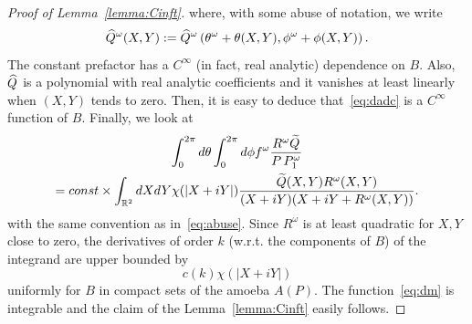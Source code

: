 \documentclass[10pt]{amsart}
\theoremstyle{definition}\newtheorem{defi}[theo]{Definition}\newtheorem{rema}[theo]{Remark}\newtheorem{exam}[theo]{Example}\newtheorem{exem}[theo]{Example}\newtheorem{nota}[theo]{Notation}
\newcommand{\bbR}{\mathbb{R}}
\let\oldtilde\tilde
\renewcommand*{\tilde}[1]{\mathchoice{\widetilde{#1}}{\widetilde{#1}}{\oldtilde{#1}}{\oldtilde{#1}}}
\let\oldhat\hat
\renewcommand*{\hat}[1]{\mathchoice{\widehat{#1}}{\widehat{#1}}{\oldhat{#1}}{\oldhat{#1}}}
\begin{document}
\begin{proof}[{Proof of Lemma~\ref{lemma:Cinft}}]
where, with some abuse of notation, we write
\begin{equation}\label{eq:abuse}
\hat Q^\omega(X,Y):=
\hat Q^\omega\left(\theta^\omega+\theta(X,Y),\phi^\omega+\phi(X,Y)\right).
\end{equation}
The constant prefactor has a $C^\infty$ (in fact, real analytic) dependence on $B$. Also, $\hat Q$ is a polynomial with real analytic coefficients and it vanishes at least linearly when $(X,Y)$ tends to zero. Then, it is easy to deduce that~\eqref{eq:dadc} is a $C^\infty$ function of $B$. Finally, we look at
\begin{multline}\label{eq:finally}
\int_0^{2\pi} d\theta \int_0^{2\pi}d\phi f^\omega \frac{R^\omega\tilde Q}{P\,P^\omega_1}\\
= const\times \int_{\bbR^2}dX dY \chi(|X+iY|)\frac{ \tilde Q (X,Y) R^\omega(X,Y)}{(X+i Y)(X+i Y+ R^\omega(X,Y))}.
\end{multline}
with the same convention as in~\eqref{eq:abuse}. Since $R^\omega$ is at least quadratic for $X,Y$ close to zero, the derivatives of order $k$ (w.r.t. the components of $B$) of the integrand are upper bounded by
\begin{equation}\label{eq:dm}
c(k)
\chi(|X+iY|)
\end{equation}
uniformly for $B$ in compact sets of the amoeba $A(P)$. The function~\eqref{eq:dm} is integrable and the claim of the Lemma~\ref{lemma:Cinft} easily follows.
\end{proof}
\end{document}
